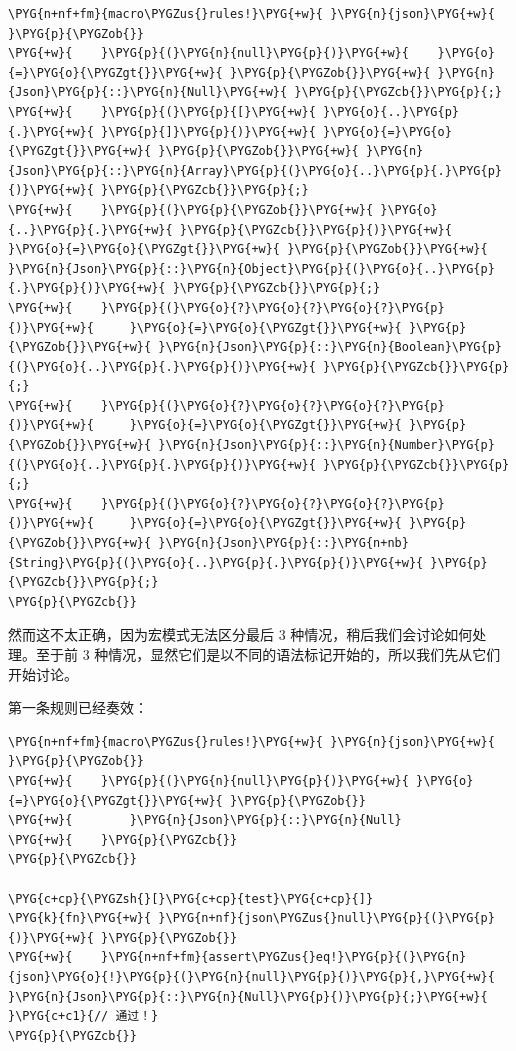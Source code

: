 \begin{Verbatim}[commandchars=\\\{\},breaklines=true,breakanywhere=true,fontsize=\codefont,xleftmargin=17bp]
\PYG{n+nf+fm}{macro\PYGZus{}rules!}\PYG{+w}{ }\PYG{n}{json}\PYG{+w}{ }\PYG{p}{\PYGZob{}}
\PYG{+w}{    }\PYG{p}{(}\PYG{n}{null}\PYG{p}{)}\PYG{+w}{    }\PYG{o}{=}\PYG{o}{\PYGZgt{}}\PYG{+w}{ }\PYG{p}{\PYGZob{}}\PYG{+w}{ }\PYG{n}{Json}\PYG{p}{::}\PYG{n}{Null}\PYG{+w}{ }\PYG{p}{\PYGZcb{}}\PYG{p}{;}
\PYG{+w}{    }\PYG{p}{(}\PYG{p}{[}\PYG{+w}{ }\PYG{o}{..}\PYG{p}{.}\PYG{+w}{ }\PYG{p}{]}\PYG{p}{)}\PYG{+w}{ }\PYG{o}{=}\PYG{o}{\PYGZgt{}}\PYG{+w}{ }\PYG{p}{\PYGZob{}}\PYG{+w}{ }\PYG{n}{Json}\PYG{p}{::}\PYG{n}{Array}\PYG{p}{(}\PYG{o}{..}\PYG{p}{.}\PYG{p}{)}\PYG{+w}{ }\PYG{p}{\PYGZcb{}}\PYG{p}{;}
\PYG{+w}{    }\PYG{p}{(}\PYG{p}{\PYGZob{}}\PYG{+w}{ }\PYG{o}{..}\PYG{p}{.}\PYG{+w}{ }\PYG{p}{\PYGZcb{}}\PYG{p}{)}\PYG{+w}{ }\PYG{o}{=}\PYG{o}{\PYGZgt{}}\PYG{+w}{ }\PYG{p}{\PYGZob{}}\PYG{+w}{ }\PYG{n}{Json}\PYG{p}{::}\PYG{n}{Object}\PYG{p}{(}\PYG{o}{..}\PYG{p}{.}\PYG{p}{)}\PYG{+w}{ }\PYG{p}{\PYGZcb{}}\PYG{p}{;}
\PYG{+w}{    }\PYG{p}{(}\PYG{o}{?}\PYG{o}{?}\PYG{o}{?}\PYG{p}{)}\PYG{+w}{     }\PYG{o}{=}\PYG{o}{\PYGZgt{}}\PYG{+w}{ }\PYG{p}{\PYGZob{}}\PYG{+w}{ }\PYG{n}{Json}\PYG{p}{::}\PYG{n}{Boolean}\PYG{p}{(}\PYG{o}{..}\PYG{p}{.}\PYG{p}{)}\PYG{+w}{ }\PYG{p}{\PYGZcb{}}\PYG{p}{;}
\PYG{+w}{    }\PYG{p}{(}\PYG{o}{?}\PYG{o}{?}\PYG{o}{?}\PYG{p}{)}\PYG{+w}{     }\PYG{o}{=}\PYG{o}{\PYGZgt{}}\PYG{+w}{ }\PYG{p}{\PYGZob{}}\PYG{+w}{ }\PYG{n}{Json}\PYG{p}{::}\PYG{n}{Number}\PYG{p}{(}\PYG{o}{..}\PYG{p}{.}\PYG{p}{)}\PYG{+w}{ }\PYG{p}{\PYGZcb{}}\PYG{p}{;}
\PYG{+w}{    }\PYG{p}{(}\PYG{o}{?}\PYG{o}{?}\PYG{o}{?}\PYG{p}{)}\PYG{+w}{     }\PYG{o}{=}\PYG{o}{\PYGZgt{}}\PYG{+w}{ }\PYG{p}{\PYGZob{}}\PYG{+w}{ }\PYG{n}{Json}\PYG{p}{::}\PYG{n+nb}{String}\PYG{p}{(}\PYG{o}{..}\PYG{p}{.}\PYG{p}{)}\PYG{+w}{ }\PYG{p}{\PYGZcb{}}\PYG{p}{;}
\PYG{p}{\PYGZcb{}}
\end{Verbatim}

然而这不太正确，因为宏模式无法区分最后 3 种情况，稍后我们会讨论如何处理。至于前 3 种情况，显然它们是以不同的语法标记开始的，所以我们先从它们开始讨论。

第一条规则已经奏效：

\begin{Verbatim}[commandchars=\\\{\},breaklines=true,breakanywhere=true,fontsize=\codefont,xleftmargin=17bp]
\PYG{n+nf+fm}{macro\PYGZus{}rules!}\PYG{+w}{ }\PYG{n}{json}\PYG{+w}{ }\PYG{p}{\PYGZob{}}
\PYG{+w}{    }\PYG{p}{(}\PYG{n}{null}\PYG{p}{)}\PYG{+w}{ }\PYG{o}{=}\PYG{o}{\PYGZgt{}}\PYG{+w}{ }\PYG{p}{\PYGZob{}}
\PYG{+w}{        }\PYG{n}{Json}\PYG{p}{::}\PYG{n}{Null}
\PYG{+w}{    }\PYG{p}{\PYGZcb{}}
\PYG{p}{\PYGZcb{}}

\PYG{c+cp}{\PYGZsh{}[}\PYG{c+cp}{test}\PYG{c+cp}{]}
\PYG{k}{fn}\PYG{+w}{ }\PYG{n+nf}{json\PYGZus{}null}\PYG{p}{(}\PYG{p}{)}\PYG{+w}{ }\PYG{p}{\PYGZob{}}
\PYG{+w}{    }\PYG{n+nf+fm}{assert\PYGZus{}eq!}\PYG{p}{(}\PYG{n}{json}\PYG{o}{!}\PYG{p}{(}\PYG{n}{null}\PYG{p}{)}\PYG{p}{,}\PYG{+w}{ }\PYG{n}{Json}\PYG{p}{::}\PYG{n}{Null}\PYG{p}{)}\PYG{p}{;}\PYG{+w}{  }\PYG{c+c1}{// 通过！}
\PYG{p}{\PYGZcb{}}
\end{Verbatim}

